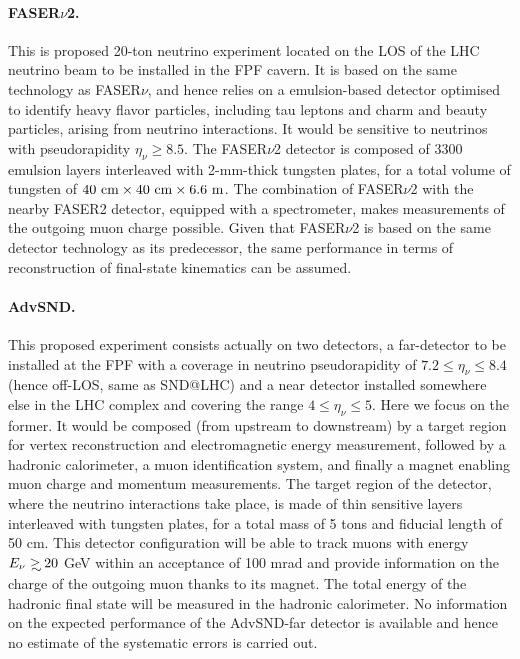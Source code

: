 \paragraph{FASER$\nu$2.}
%
This is proposed 20-ton neutrino experiment located on the LOS
of the LHC neutrino beam to be installed in the FPF cavern.
%
It is based on the same technology as FASER$\nu$, and hence
relies on a emulsion-based detector optimised to identify heavy flavor particles, including
tau leptons and charm and beauty particles, arising from neutrino interactions.
%
It would be sensitive to neutrinos with pseudorapidity $\eta_\nu \ge 8.5$.
%
The FASER$\nu$2 detector is composed of 3300 emulsion layers interleaved with 2-mm-thick tungsten plates,
for a total volume of  tungsten of $40~\rm{cm} \times 40~\rm{cm} \times 6.6~{\rm m}$.
%
The combination of FASER$\nu$2  with the nearby FASER2 detector, equipped with a spectrometer, makes measurements of the outgoing muon charge possible.
%
Given that FASER$\nu$2 is based on the same detector technology
as its predecessor, the same performance in terms of reconstruction
of final-state kinematics can be assumed.

 \paragraph{AdvSND.}
 This proposed experiment consists actually on  two detectors, a far-detector to be installed
 at the FPF with a coverage in neutrino pseudorapidity of $7.2 \le \eta_\nu \le 8.4$
 (hence off-LOS, same as SND@LHC) and a near detector installed somewhere else in the LHC
 complex and covering the range $4 \le \eta_\nu \le 5$.
Here we focus on the former.
 It would be
 composed (from upstream to downstream) by a target region
 for  vertex reconstruction and electromagnetic energy measurement, followed  by a hadronic calorimeter, a  muon 
 identification system, and finally  a magnet enabling muon charge and momentum measurements.
 The target region of the detector, where the neutrino interactions take place, is made of thin sensitive layers 
 interleaved with tungsten plates, for a total mass of 5 tons and fiducial length of 50 cm.
 This detector configuration will be able to track muons with energy $E_\nu \gsim 20$ GeV
 within an acceptance of 100 mrad and provide information on the charge
 of the  outgoing muon thanks to its magnet.
 The total energy of the hadronic final state will be measured
 in the hadronic calorimeter.
 No information on the expected performance of the AdvSND-far detector
 is available and hence no estimate of the systematic errors
 is carried out.


